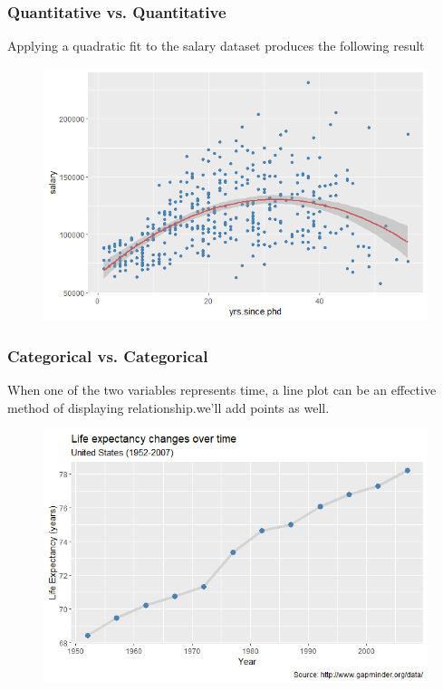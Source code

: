 \documentclass{beamer}
\begin{document}

\begin{frame}[fragile] %
\frametitle{Quantitative vs. Quantitative}

\begin{example} 
Applying a quadratic fit to the salary dataset produces the following result

\end{example}
\begin{figure}
\includegraphics[width=0.8\linewidth]{Seminar_3_images/R/07.png}
\end{figure}
\end{frame}



\begin{frame}[fragile] %
\frametitle{Categorical vs. Categorical}

\begin{example} 

When one of the two variables represents time, a line plot can be an effective method of displaying relationship.we’ll add points as well.

\end{example}
\begin{figure}
\includegraphics[width=0.8\linewidth]{Seminar_3_images/R/08.png}
\end{figure}
\end{frame}
\end{document}
